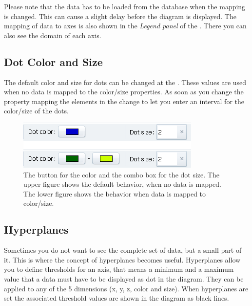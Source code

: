 Please note that the data has to be loaded from the database when
the mapping is changed. This can cause a slight delay before the diagram
is displayed. The mapping of data to axes is also shown in the \textit{Legend
panel} of the \sbar. There you can also see the domain of each
axis.


\subsection{Dot Color and Size}

The default color and size for dots can be changed at the \tbar.
These values are used when no data is mapped to the color/size properties.
As soon as you change the property mapping the elements in the \tbar
change to let you enter an interval for the color/size of the dots.

%
\begin{figure}
\begin{centering}
\includegraphics[width=0.3\columnwidth]{images/plot/dotcolor}
\par\end{centering}

\caption[Configuring dot colors]{The button for the color and the combo box for the dot size. The upper
figure shows the default behavior, when no data is mapped. The lower
figure shows the behavior when data is mapped to color/size.}
%
\end{figure}



\subsection{Hyperplanes}

Sometimes you do not want to see the complete set of data, but a small
part of it. This is where the concept of hyperplanes becomes useful.
Hyperplanes allow you to define thresholds for an axis, that means
a minimum and a maximum value that a data must have to be displayed
as dot in the diagram. They can be applied to any of the 5 dimensions (x,
y, z, color and size). When hyperplanes are set the associated threshold
values are shown in the diagram as black lines.

